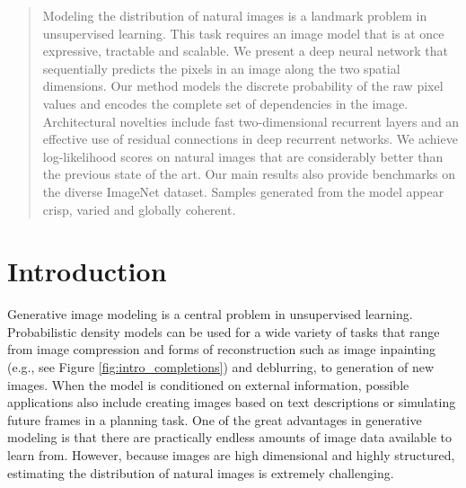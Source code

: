 \documentclass{article}
\begin{document}
 


\begin{abstract} 

Modeling the distribution of natural images is a landmark problem in unsupervised learning.
This task requires an image model that is at once expressive, tractable and scalable. We present a deep neural network that sequentially predicts the pixels in an image along the two spatial dimensions. Our method models the discrete probability of the raw pixel values and encodes the complete set of dependencies in the image. Architectural novelties include fast two-dimensional recurrent layers and an effective use of residual connections in deep recurrent networks. 
We achieve log-likelihood scores on natural images that are considerably better than the previous state of the art.
Our main results also provide benchmarks on the diverse ImageNet dataset. Samples generated from the model appear crisp, varied and globally coherent.

\end{abstract} 
 \section{Introduction}

Generative image modeling is a central problem in unsupervised learning. Probabilistic density models can be used for a wide variety of tasks that range from image compression and forms of reconstruction such as image inpainting (e.g., see Figure \ref{fig:intro_completions}) and deblurring, to generation of new images. When the model is conditioned on external information, possible applications also include creating images based on text descriptions or simulating future frames in a planning task. One of the great advantages in generative modeling is that there are practically endless amounts of image data available to learn from. However, because images are high dimensional and highly structured, estimating the distribution of natural images is extremely challenging.
\end{document}

